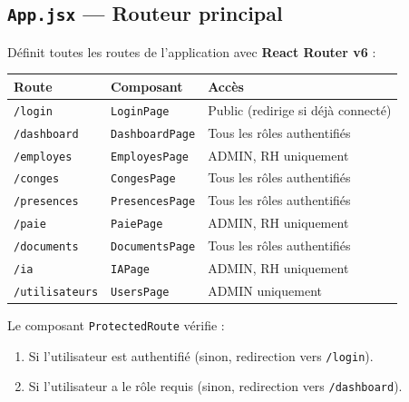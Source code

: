 \documentclass[a4paper,12pt]{report}
\begin{document}
\subsection{\texttt{App.jsx} --- Routeur principal}
Définit toutes les routes de l'application avec \textbf{React Router v6} :

\begin{center}
\begin{tabularx}{\textwidth}{|l|l|X|}
\hline
\textbf{Route} & \textbf{Composant} & \textbf{Accès} \\
\hline
\texttt{/login} & \texttt{LoginPage} & Public (redirige si déjà connecté) \\
\hline
\texttt{/dashboard} & \texttt{DashboardPage} & Tous les rôles authentifiés \\
\hline
\texttt{/employes} & \texttt{EmployesPage} & ADMIN, RH uniquement \\
\hline
\texttt{/conges} & \texttt{CongesPage} & Tous les rôles authentifiés \\
\hline
\texttt{/presences} & \texttt{PresencesPage} & Tous les rôles authentifiés \\
\hline
\texttt{/paie} & \texttt{PaiePage} & ADMIN, RH uniquement \\
\hline
\texttt{/documents} & \texttt{DocumentsPage} & Tous les rôles authentifiés \\
\hline
\texttt{/ia} & \texttt{IAPage} & ADMIN, RH uniquement \\
\hline
\texttt{/utilisateurs} & \texttt{UsersPage} & ADMIN uniquement \\
\hline
\end{tabularx}
\end{center}

Le composant \texttt{ProtectedRoute} vérifie :
\begin{enumerate}
  \item Si l'utilisateur est authentifié (sinon, redirection vers \texttt{/login}).
  \item Si l'utilisateur a le rôle requis (sinon, redirection vers \texttt{/dashboard}).
\end{enumerate}
\end{document}

